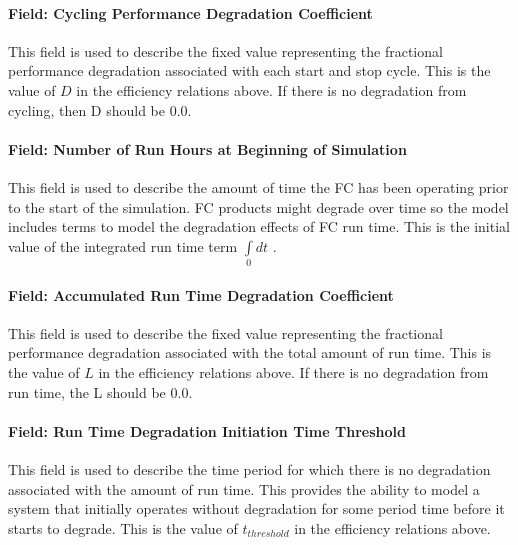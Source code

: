 \paragraph{Field: Cycling Performance Degradation Coefficient}\label{field-cycling-performance-degradation-coefficient}

This field is used to describe the fixed value representing the fractional performance degradation associated with each start and stop cycle. This is the value of \(D\) in the efficiency relations above. If there is no degradation from cycling, then D should be 0.0.

\paragraph{Field: Number of Run Hours at Beginning of Simulation}\label{field-number-of-run-hours-at-beginning-of-simulation}

This field is used to describe the amount of time the FC has been operating prior to the start of the simulation. FC products might degrade over time so the model includes terms to model the degradation effects of FC run time. This is the initial value of the integrated run time term \(\int\limits_0 {dt}\) .

\paragraph{Field: Accumulated Run Time Degradation Coefficient}\label{field-accumulated-run-time-degradation-coefficient}

This field is used to describe the fixed value representing the fractional performance degradation associated with the total amount of run time. This is the value of \(L\) in the efficiency relations above. If there is no degradation from run time, the L should be 0.0.

\paragraph{Field: Run Time Degradation Initiation Time Threshold}\label{field-run-time-degradation-initiation-time-threshold}

This field is used to describe the time period for which there is no degradation associated with the amount of run time. This provides the ability to model a system that initially operates without degradation for some period time before it starts to degrade. This is the value of \({t_{threshold}}\) in the efficiency relations above.

